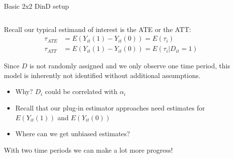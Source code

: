 \documentclass[notes,11pt, aspectratio=169]{beamer}
\newenvironment{wideitemize}{\itemize\addtolength{\itemsep}{10pt}}{\enditemize}
\begin{document}
\begin{frame}{Basic 2x2 DinD setup}
  \begin{columns}[T] %
    \begin{column}{0.8\textwidth}
      \begin{wideitemize}
      \item Recall our typical estimand of interest is the ATE or the ATT:
        \begin{align*}
          \tau_{ATE} &= E(Y_{it}(1) - Y_{it}(0)) = E(\tau_{i})\\
          \tau_{ATT} &= E(Y_{it}(1) - Y_{it}(0)) = E(\tau_{i} |D_{it} = 1)          
        \end{align*}
      \item Since $D$ is not randomly assigned and we only observe one time
        period, this model is inherently not identified without additional assumptions.
        \begin{itemize}
        \item Why? $D_{i}$ could be correlated with $\alpha_{i}$
        \item Recall that our plug-in estimator approaches need
          estimates for $E(Y_{it}(1))$ and $E(Y_{it}(0))$
        \item Where can we get unbiased estimates?
        \end{itemize}
      \item With two time periods we can make a lot more progress!
      \end{wideitemize}
    \end{column}%
    \hfill%
    \begin{column}{.45\textwidth}
    \end{column}%
  \end{columns}
\end{frame}
\end{document}
